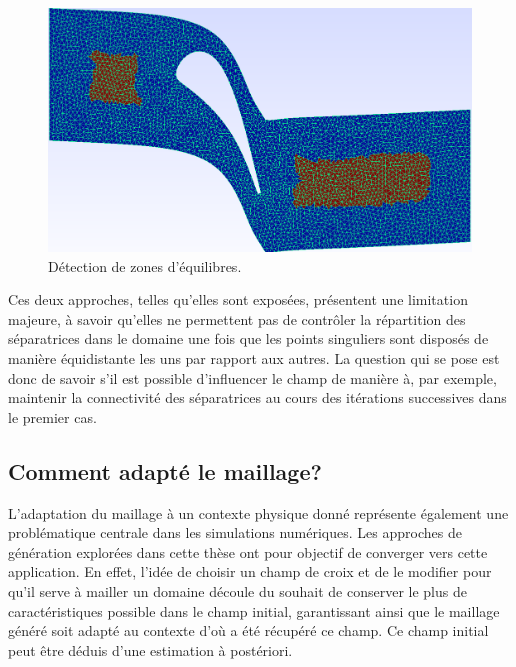 \begin{figure}[h!]
\centering
\includegraphics[scale=0.35]{images/coloriage.png}
\caption{Détection de zones d'équilibres.}
\label{fig:coloriage}
\end{figure}
Ces deux approches, telles qu'elles sont exposées, présentent une limitation majeure, à savoir qu'elles ne permettent pas de contrôler la répartition des séparatrices dans le domaine une fois que les points singuliers sont disposés de manière équidistante les uns par rapport aux autres. La question qui se pose est donc de savoir s'il est possible d'influencer le champ de manière à, par exemple, maintenir la connectivité des séparatrices au cours des itérations successives dans le premier cas.


\subsection*{Comment adapté le maillage?}

L'adaptation du maillage à un contexte physique donné représente également une problématique centrale dans les simulations numériques. Les approches de génération explorées dans cette thèse ont pour objectif de converger vers cette application. En effet, l'idée de choisir un champ de croix et de le modifier pour qu'il serve à mailler un domaine découle du souhait de conserver le plus de caractéristiques possible dans le champ initial, garantissant ainsi que le maillage généré soit adapté au contexte d'où a été récupéré ce champ. Ce champ initial peut être déduis d'une estimation à postériori.

